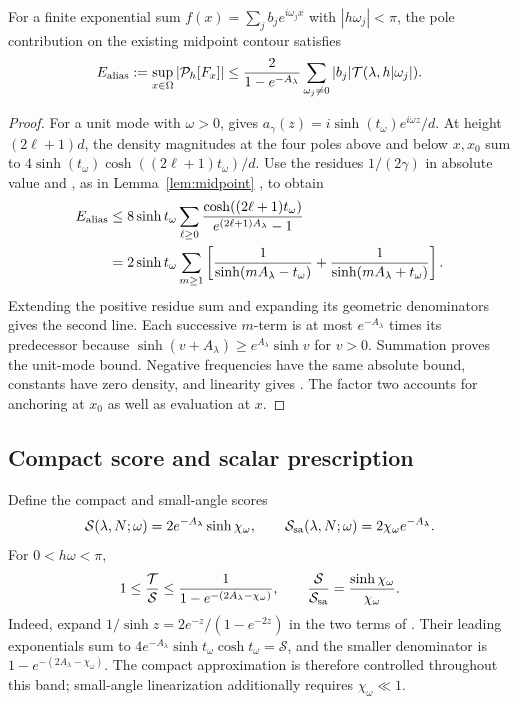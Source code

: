 \begin{proposition}
\label{prop:bandwidth-alias}
For a finite exponential sum $f(x)=\sum_j b_je^{i\omega_jx}$ with
$|h\omega_j|<\pi$, the pole contribution on the existing midpoint contour
satisfies
\begin{equation}
 E_{\rm alias}:=\sup_{x\in\Omega}|\mathcal P_h[F_x]|
 \le\frac{2}{1-e^{-A_\lambda}}
       \sum_{\omega_j\ne0}|b_j|\mathcal T(\lambda,h|\omega_j|).
 \label{eq:bandwidth-weighted-bound}
\end{equation}
\end{proposition}
\begin{proof}
For a unit mode with $\omega>0$,  gives
$a_\gamma(z)=i\sinh(t_\omega)e^{i\omega z}/d$. At height
$(2\ell+1)d$, the density magnitudes at the four poles above and below
$x,x_0$ sum to $4\sinh(t_\omega)\cosh((2\ell+1)t_\omega)/d$.
Use the residues $1/(2\gamma)$ in absolute value and
, as in Lemma~\ref{lem:midpoint}
\cite[Secs.~4--5]{JavedTrefethen2014}, to obtain
\begin{align*}
 E_{\rm alias}
 &\le8\sinh t_\omega\sum_{\ell\ge0}
       \frac{\cosh((2\ell+1)t_\omega)}{e^{(2\ell+1)A_\lambda}-1}\\
 &=2\sinh t_\omega\sum_{m\ge1}
       \left[\frac1{\sinh(mA_\lambda-t_\omega)}
             +\frac1{\sinh(mA_\lambda+t_\omega)}\right].
\end{align*}
Extending the positive residue sum and expanding its geometric denominators
gives the second line. Each successive $m$-term is at most
$e^{-A_\lambda}$ times its predecessor because
$\sinh(v+A_\lambda)\ge e^{A_\lambda}\sinh v$ for $v>0$.
Summation proves the unit-mode bound. Negative frequencies have the same
absolute bound, constants have zero density, and linearity gives
. The factor two accounts for anchoring
at $x_0$ as well as evaluation at $x$.
\end{proof}

\subsection{Compact score and scalar prescription}
Define the compact and small-angle scores
\begin{equation}
 \mathcal S(\lambda,N;\omega)=2e^{-A_\lambda}\sinh\chi_\omega,
 \qquad
 \mathcal S_{\rm sa}(\lambda,N;\omega)=2\chi_\omega e^{-A_\lambda}.
 \label{eq:bandwidth-scores}
\end{equation}
For $0<h\omega<\pi$,
\begin{equation}
 1\le\frac{\mathcal T}{\mathcal S}
 \le\frac1{1-e^{-(2A_\lambda-\chi_\omega)}},
 \qquad
 \frac{\mathcal S}{\mathcal S_{\rm sa}}
 =\frac{\sinh\chi_\omega}{\chi_\omega}.
 \label{eq:bandwidth-score-comparison}
\end{equation}
Indeed, expand $1/\sinh z=2e^{-z}/(1-e^{-2z})$ in the two terms of
. Their leading exponentials sum to
$4e^{-A_\lambda}\sinh t_\omega\cosh t_\omega=\mathcal S$, and the
smaller denominator is $1-e^{-(2A_\lambda-\chi_\omega)}$.
The compact approximation is therefore controlled throughout this band;
small-angle linearization additionally requires $\chi_\omega\ll1$.

